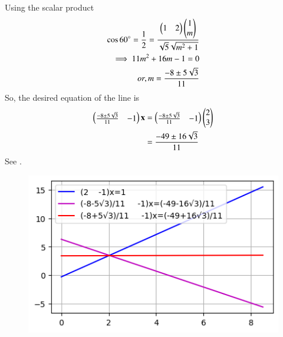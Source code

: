 Using the scalar product
\begin{align}
  \cos{60\degree}=
\frac{1}{2}=\frac{\begin{pmatrix}
        1&2
    \end{pmatrix}\begin{pmatrix}
        1\\m
    \end{pmatrix}}{\sqrt{5}\sqrt{m^2+1}}\\
\implies 11m^2+16m-1=0\\
   or, m=\frac{-8\pm5\sqrt{3}}{11}    
\end{align}
So, the desired equation of the line is
\begin{align}
\begin{pmatrix}
    \frac{-8\pm5\sqrt{3}}{11}&-1
\end{pmatrix}\mathbf{x} 
	&=
\begin{pmatrix}
    \frac{-8\pm5\sqrt{3}}{11}&-1
\end{pmatrix}
\begin{pmatrix}
    2\\3\end{pmatrix}
    \\
	&=\frac{-49\pm16\sqrt{3}}{11}
\end{align}
See 
    .
\begin{figure}[!ht]
    \centering
    \includegraphics[width=\columnwidth]{chapters/11/10/3/12/fig/asgnt1.png}
    \caption{}
    \label{fig:11.10.3.12}
\end{figure}

